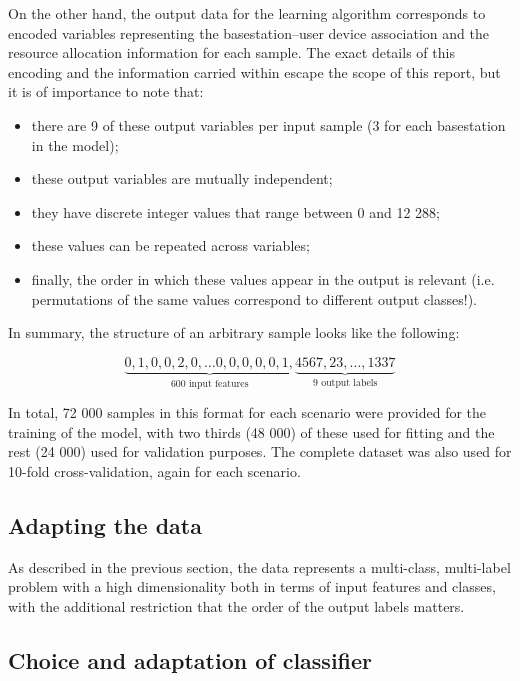 \documentclass{kthreport}
\theoremstyle{definition}
\begin{document}
On the other hand, the output data for the learning algorithm corresponds to encoded variables representing the basestation--user device association and the resource allocation information for each sample. The exact details of this encoding and the information carried within escape the scope of this report, but it is of importance to note that:
\begin{itemize}
	\item there are 9 of these output variables per input sample (3 for each basestation in the model);
	\item these output variables are mutually independent;
	\item they have discrete integer values that range between 0 and 12 288;
	\item these values can be repeated across variables;
	\item finally, the order in which these values appear in the output is relevant (i.e. permutations of the same values correspond to different output classes!).
\end{itemize} 

In summary, the structure of an arbitrary sample looks like the following:

\[\underbrace{0, 1, 0, 0, 2, 0, \ldots 0, 0, 0, 0, 0, 1,}_{\text{600 input features}}\underbrace{4567, 23, \ldots , 1337}_{\text{9 output labels}}\]

In total, 72 000 samples in this format for each scenario were provided for the training of the model, with two thirds (48 000) of these used for fitting and the rest (24 000) used for validation purposes. The complete dataset was also used for 10-fold cross-validation, again for each scenario.

\subsection{Adapting the data} \label{sec:problemtransform}

As described in the previous section, the data represents a multi-class, multi-label problem with a high dimensionality both in terms of input features and classes, with the additional restriction that the order of the output labels matters. \autocite{tsoumakas2009mining}

\subsection{Choice and adaptation of classifier}\label{sec:cfchoice}
\end{document}
